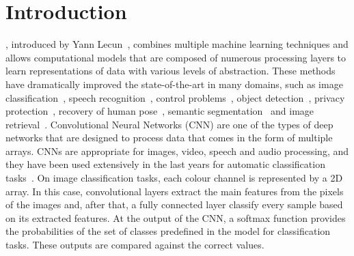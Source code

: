 \documentclass[journal]{IEEEtran}
\begin{document}
	
	
	\section{Introduction}
	\label{sect:introduction}
	, introduced by Yann Lecun~\cite{lecun2015deep}, combines multiple machine learning techniques and allows computational models that are composed of numerous processing layers to learn representations of data with various levels of abstraction. These methods have dramatically improved the state-of-the-art in many domains, such as image classification~\cite{cirecsan2012multi,he2016deep,krizhevsky2012imagenet}, speech recognition~\cite{hinton2012deep}, control problems~\cite{mnih2015human}, object detection~\cite{jiang2016speed,girshick2014rich}, privacy protection~\cite{yu2017iprivacy}, recovery of human pose~\cite{hong2015multimodal}, semantic segmentation~\cite{long2015fully} and image retrieval~\cite{li2015weakly}. Convolutional Neural Networks (CNN) are one of the types of deep networks that are designed to process data that comes in the form of multiple arrays. CNNs are appropriate for images, video, speech and audio processing, and they have been used extensively in the last years for automatic classification tasks~\cite{dong2014learning,sun2013deep,ronneberger2015u}. On image classification tasks, each colour channel is represented by a 2D array. In this case, convolutional layers extract the main features from the pixels of the images and, after that, a fully connected layer classify every sample based on its extracted features. At the output of the CNN, a softmax function provides the probabilities of the set of classes predefined in the model for classification tasks. These outputs are compared against the correct values.
	
\end{document}
